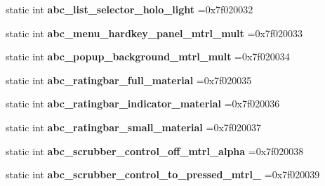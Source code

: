 \begin{DoxyCompactItemize}
static int {\bfseries abc\+\_\+list\+\_\+selector\+\_\+holo\+\_\+light} =0x7f020032
\item 
\mbox{\label{classandroid_1_1support_1_1v7_1_1mediarouter_1_1R_1_1drawable_a239b951d4cbf480937a7832757142bb0}} 
static int {\bfseries abc\+\_\+menu\+\_\+hardkey\+\_\+panel\+\_\+mtrl\+\_\+mult} =0x7f020033
\item 
\mbox{\label{classandroid_1_1support_1_1v7_1_1mediarouter_1_1R_1_1drawable_a2d606475d4e40ab3a19518f3a4dfc5a1}} 
static int {\bfseries abc\+\_\+popup\+\_\+background\+\_\+mtrl\+\_\+mult} =0x7f020034
\item 
\mbox{\label{classandroid_1_1support_1_1v7_1_1mediarouter_1_1R_1_1drawable_a1c5037a820ff1abfa0f37f4ae1b3991e}} 
static int {\bfseries abc\+\_\+ratingbar\+\_\+full\+\_\+material} =0x7f020035
\item 
\mbox{\label{classandroid_1_1support_1_1v7_1_1mediarouter_1_1R_1_1drawable_aebe2d0f46cb67fe0a66e6506867dd876}} 
static int {\bfseries abc\+\_\+ratingbar\+\_\+indicator\+\_\+material} =0x7f020036
\item 
\mbox{\label{classandroid_1_1support_1_1v7_1_1mediarouter_1_1R_1_1drawable_af822730dc3d0fe058643fd941283e89e}} 
static int {\bfseries abc\+\_\+ratingbar\+\_\+small\+\_\+material} =0x7f020037
\item 
\mbox{\label{classandroid_1_1support_1_1v7_1_1mediarouter_1_1R_1_1drawable_a4b6731014b66698c33fd258545322a19}} 
static int {\bfseries abc\+\_\+scrubber\+\_\+control\+\_\+off\+\_\+mtrl\+\_\+alpha} =0x7f020038
\item 
\mbox{\label{classandroid_1_1support_1_1v7_1_1mediarouter_1_1R_1_1drawable_a70724736f352e5ff8ab71bedbe7e8d96}} 
static int {\bfseries abc\+\_\+scrubber\+\_\+control\+\_\+to\+\_\+pressed\+\_\+mtrl\+\_} =0x7f020039
\item 

\end{DoxyCompactItemize}
